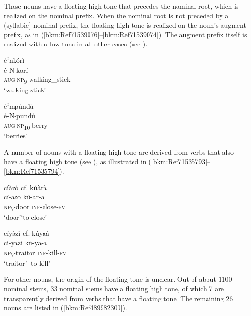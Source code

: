 These nouns have a floating high tone that precedes the nominal root, which is realized on the nominal prefix. When the nominal root is not preceded by a (syllabic) nominal prefix, the floating high tone is realized on the noun’s augment prefix, as in (\ref{bkm:Ref71539076}--\ref{bkm:Ref71539074}). The augment prefix itself is realized with a low tone in all other cases (see ).

\ea
\label{bkm:Ref71539076}
\glll éꜝnkórì\\
é-N-korí\\
\textsc{aug}-\textsc{np}\textsubscript{9}-walking\_stick\\
\glt ‘walking stick’
\z

\ea
\label{bkm:Ref71539074}
\glll éꜝmpúndù\\
é-N-pundú\\
\textsc{aug}-\textsc{np}\textsubscript{10}-berry\\
\glt ‘berries’
\z

A number of nouns with a floating high tone are derived from verbs that also have a floating high tone (see ), as illustrated in (\ref{bkm:Ref71535793}--\ref{bkm:Ref71535794}).

\ea
\label{bkm:Ref71535793}
cíàzò \tab     cf. kúàrà\\
cí-azo \tab kú-ar-a\\
\textsc{np}\textsubscript{7}-door \tab \textsc{inf}-close-\textsc{fv}\\
\glt ‘door’\tab     ‘to close’
\z

\ea
\label{bkm:Ref71535794}
cíyàzì  \tab     cf.  kúyàà\\
cí-yazi   \tab  kú-ya-a\\
\textsc{np}\-\textsubscript{7}-traitor   \tab \textsc{inf}-kill-\textsc{fv}\\
\glt ‘traitor’ \tab   ‘to kill’
\z

For other nouns, the origin of the floating tone is unclear. Out of about 1100 nominal stems, 33 nominal stems have a floating high tone, of which 7 are transparently derived from verbs that have a floating tone. The remaining 26 nouns are listed in (\ref{bkm:Ref489982300}).


